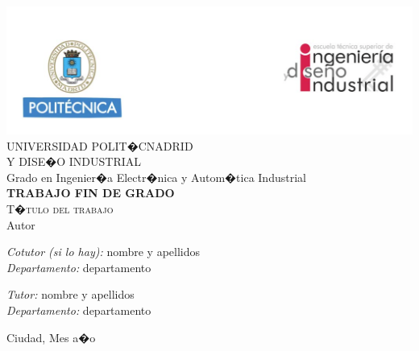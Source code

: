 \begin{titlepage}
\begin{center}

 \includegraphics[width=1\textwidth]{figuras/cabecera.png}  \\[0.5 cm]

\LARGE UNIVERSIDAD POLIT�CNADRID \\ [1 cm]

\LARGE  Y DISE�O INDUSTRIAL \\ [1 cm]

\LARGE Grado en Ingenier�a Electr�nica y Autom�tica Industrial\\ [1 cm]

\LARGE \textbf{TRABAJO FIN DE GRADO}\\[1 cm]

\Huge \textsc{T�tulo del trabajo}\\[1 cm]

\LARGE Autor \\[2 cm]


\begin{multicols}{2} 
\begin{flushleft} \Large
\emph{Cotutor (si lo hay):} nombre y apellidos \\
\emph{Departamento:} departamento
\end{flushleft}

\begin{flushleft} \Large
\emph{Tutor:} nombre y apellidos\\
\emph{Departamento:} departamento
\end{flushleft}

\end{multicols} 

\vfill

{\large Ciudad, Mes a�o}

\end{center}
\end{titlepage}
